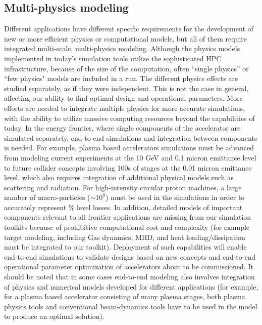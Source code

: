 \subsection{Multi-physics modeling}
 Different applications have different specific
requirements for the development of new or more efficient physics
or computational models, but all of them require integrated
multi-scale, multi-physics modeling.  
Although the physics models implemented in today's simulation tools utilize the  sophisticated HPC infrastructure, because of the size of the computation, often ``single physics'' or ``few physics" models are included in a run. The different physics effects are studied separately, as if they were independent.  This is not the case in general, affecting our ability to find optimal design and operational parameters.  More efforts are needed to integrate multiple physics for more accurate simulations, with the ability to utilize massive computing resources beyond the capabilities of today. 
   In the energy frontier, where single components of the accelerator are simulated separately, end-to-end simulations and integration between components is needed.  For example, plasma based accelerators simulations must be advanced from modeling current experiments at the 10 GeV and 0.1 micron emittance level to future collider concepts involving 100s of stages at the 0.01 micron emittance level, which also requires integration of additional physical models such as scattering and radiation. For high-intensity circular proton machines, a large number of macro-particles ($\sim 10^9$) must be used in the simulations in order to accurately represent \% level losses. In addition, detailed models of important components relevant to all frontier applications are missing from our simulation toolkits because of prohibitive computational cost and complexity (for example target modeling, including Gas dynamics, MHD, and heat loading/dissipation must be integrated to our toolkit). 
Deployment of such capabilities
will enable end-to-end simulations to validate designs based on
new concepts and end-to-end operational parameter optimization of
accelerators about to be commissioned.  It should be noted that
in some cases end-to-end modeling also involves integration of physics
and numerical models developed for different applications (for
example, for a plasma based accelerator consisting of many plasma
stages, both plasma physics tools and conventional beam-dynamics
tools have to be used in the model to produce an optimal
solution).

